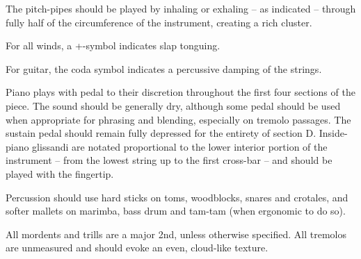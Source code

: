 \documentclass[10pt]{article}
\begin{document}
\begin{textblock}{13}
The pitch-pipes should be played by inhaling or exhaling -- as indicated --
through fully half of the circumference of the instrument, creating a rich
cluster.

For all winds, a +-symbol indicates slap tonguing.

For guitar, the coda symbol indicates a percussive damping of the strings.

Piano plays with pedal to their discretion throughout the first four sections
of the piece. The sound should be generally dry, although some pedal should be
used when appropriate for phrasing and blending, especially on tremolo
passages. The sustain pedal should remain fully depressed for the entirety of
section D. Inside-piano glissandi are notated proportional to the lower
interior portion of the instrument -- from the lowest string up to the first
cross-bar -- and should be played with the fingertip.

Percussion should use hard sticks on toms, woodblocks, snares and crotales, and
softer mallets on marimba, bass drum and tam-tam (when ergonomic to do so).

All mordents and trills are a major 2nd, unless otherwise specified. All
tremolos are unmeasured and should evoke an even, cloud-like texture.

\end{textblock}
\end{document}
